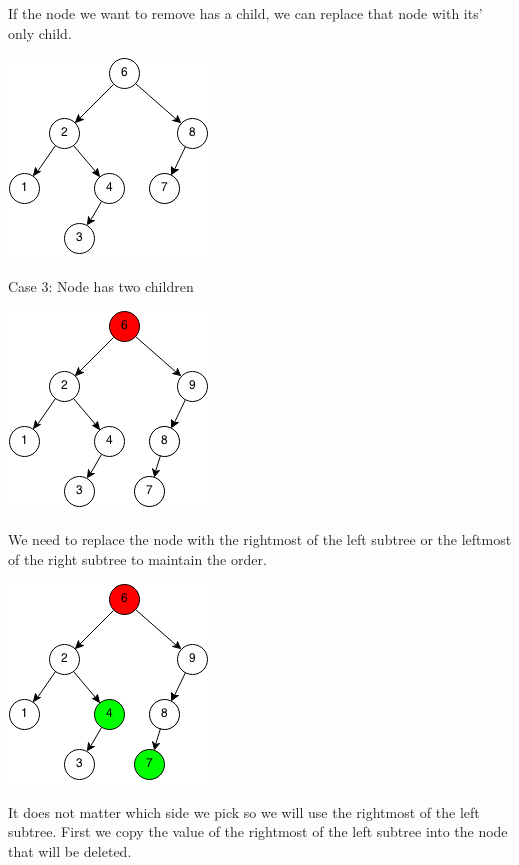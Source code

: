 \documentclass[11pt,oneside]{book}
\makeatletter
\def\maxwidth#1{\ifdim\Gin@nat@width>#1 #1\else\Gin@nat@width\fi}
\makeatother
\begin{document}
If the node we want to remove has a child, we can replace that node with its' only child.

\vspace{5px}\includegraphics[width=\maxwidth{\textwidth}]{bst-rem-case22.png}

Case 3: Node has two children

\vspace{5px}\includegraphics[width=\maxwidth{\textwidth}]{bst-rem-case31.png}

We need to replace the node with the rightmost of the left subtree or the leftmost of the right subtree to maintain the order.

\vspace{5px}\includegraphics[width=\maxwidth{\textwidth}]{bst-rem-case32.png}

It does not matter which side we pick so we will use the rightmost of the left subtree. First we copy the value of the rightmost of the left subtree into the node that will be deleted.
\end{document}
